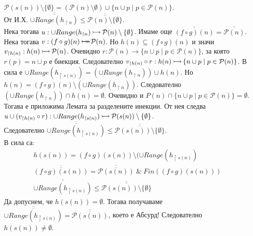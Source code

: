\documentclass[12pt]{article}
\newcommand{\injection}[0]{\,\mathlarger{\mathlarger{\rightarrowtail}}\,}
\newcommand{\bijection}[0]{\mathbin{\mathlarger{\mathlarger{\rightarrowtail}} \hspace{-14pt} \mathlarger{\mathlarger{\twoheadrightarrow}}}}
\begin{document}
\(\mathcal{P}(s(n)) \setminus \{\emptyset\}
= (\mathcal{P}(n) \setminus \emptyset) \cup \{n \cup p \; | \; p \in  \mathcal{P}(n)\}\). \\
От И.Х. \(\overline{\overline{\cup Range(h_{\restriction n}) }} \leq \overline{\overline{\mathcal{P}(n) \setminus \{\emptyset\}}}\). \\
Нека тогава
\(u : \cup Range(h_{\restriction n}) \injection \mathcal{P}(n) \setminus \{\emptyset\}\).
Имаме още \(\overline{\overline{(f \circ g)(n)}} = \overline{\overline{\mathcal{P}(n)}}\).
Нека тогава \(v : (f \circ g)(n) \bijection \mathcal{P}(n)\).
Но \(h(n) \subseteq (f \circ g)(n)\)
и значи \\
\(v_{\restriction h(n)} : h(n) \injection \mathcal{P}(n)\).
Очевидно \(r : \mathcal{P}(n) \to \{n \cup p \; | \; p \in  \mathcal{P}(n)\}\),
за която \(r(p) = n \cup p\) е биекция.
Следователно \(v_{\restriction h(n)} \circ r : h(n) \injection \{n \cup p \; | \; p \in  \mathcal{P}(n)\}\).
В сила е \(\cup Range(h_{\restriction s(n)}) = (\cup Range(h_{\restriction n})) \cup h(n)\). Но \\
\(h(n) = (f \circ g)(n) \setminus (\cup Range(h_{\restriction n}))\).
Следователно \((\cup Range(h_{\restriction n})) \cap h(n) = \emptyset\).
Очевидно и \(P(n) \cap \{n \cup p \; | \; p \in  \mathcal{P}(n)\} = \emptyset\).
Тогава е приложима Лемата за разделените инекции.
От нея следва \\
\(u \cup (v_{\restriction h(n)} \circ r) : \cup Range(h_{\restriction s(n)}) \injection \mathcal{P}(s(n)) \setminus \{\emptyset\}\). \\
Следователно \(\overline{\overline{\cup Range(h_{\restriction s(n)})}} \leq \overline{\overline{\mathcal{P}(s(n)) \setminus \{\emptyset\}}}\). \\
В сила са:
\begin{align*}
    h(s(n)) = (f \circ g)(s(n)) \setminus (\cup Range(h_{\restriction s(n)}) \\
    \overline{\overline{(f \circ g)(s(n))}} = \overline{\overline{\mathcal{P}(s(n))}} \; \& \; Fin((f \circ g)(s(n))) \\
    \overline{\overline{\cup Range(h_{\restriction s(n)})}} \leq \overline{\overline{\mathcal{P}(s(n)) \setminus \{\emptyset\}}}
\end{align*}
Да допуснем, че \(h(s(n)) = \emptyset\).
Тогава получаваме \(\overline{\overline{\cup Range(h_{\restriction s(n)})}} = \overline{\overline{\mathcal{P}(s(n))}}\), което е Абсурд!
Следователно \(h(s(n)) \neq \emptyset\).
\\
\end{document}
